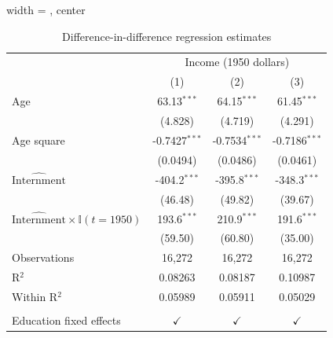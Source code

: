 \documentclass{beamer}
\begin{document}
\begin{frame}
\begin{table}[htbp]
   \caption{\label{tbl:regdid} Difference-in-difference regression estimates}
   \begin{adjustbox}{width = \textwidth, center}
      \begin{tabular}{lccc}
         \toprule
          & \multicolumn{3}{c}{Income (1950 dollars)}\\
                                                                      & (1)             & (2)             & (3)\\  
         \midrule 
         Age                                                     & 63.13$^{***}$   & 64.15$^{***}$   & 61.45$^{***}$\\   
                                                                      & (4.828)         & (4.719)         & (4.291)\\   
         Age square                                              & -0.7427$^{***}$ & -0.7534$^{***}$ & -0.7186$^{***}$\\   
                                                                      & (0.0494)        & (0.0486)        & (0.0461)\\   
         $\widehat{\text{Internment}}$                                & -404.2$^{***}$  &  -395.8$^{***}$ & -348.3$^{***}$\\ 
                                                                      & (46.48)         &  (49.82)        & (39.67)\\        
         \rowcolor{blue!30}$\widehat{\text{Internment}}\times \mathbb{I}(t = 1950)$  & 193.6$^{***}$   &  210.9$^{***}$  & 191.6$^{***}$\\  
         \rowcolor{blue!30}                                           & (59.50)         &  (60.80)        & (35.00)\\        
         Observations                                                 & 16,272          & 16,272          & 16,272\\  
         R$^2$                                                        & 0.08263         & 0.08187         & 0.10987\\  
         Within R$^2$                                                 & 0.05989         & 0.05911         & 0.05029\\  
          \\
         Education fixed effects                                          & $\checkmark$    & $\checkmark$    & $\checkmark$\\   

\end{tabular}
\end{adjustbox}
\end{table}
\end{frame}
\end{document}
